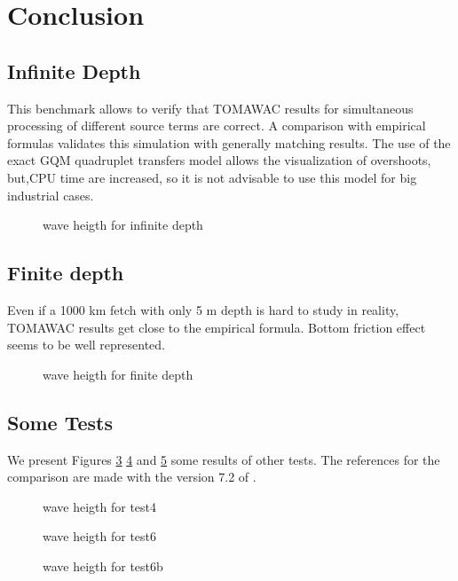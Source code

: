 \section{Conclusion}
\subsection{Infinite Depth}
This benchmark allows to verify that TOMAWAC results for simultaneous processing of different source terms are correct. A comparison with empirical formulas validates this simulation with generally matching results. The use of the exact GQM quadruplet transfers model allows the visualization of overshoots, but,CPU time are increased, so it is not advisable to use this model for big industrial cases.
\begin{figure}[h!]
  \centering
  \caption{wave heigth for infinite depth}
\label{resultinfinite}
\end{figure}

\subsection{Finite depth}
Even if a 1000 km fetch with only 5 m depth is hard to study in reality, TOMAWAC results get close to the empirical formula. Bottom friction effect seems to be well represented.
\begin{figure}[h!]
  \centering
  \caption{wave heigth for finite depth}
\label{finite}
\end{figure}


\subsection{Some Tests}
We present Figures \ref{test4} \ref{test6} and \ref{test6b} some results of other tests. The references for the comparison are made with the version 7.2 of \tomawac.   
\begin{figure}[h!]
  \centering
  \caption{wave heigth for test4}
\label{test4}
\end{figure}
\begin{figure}[h!]
  \centering
  \caption{wave heigth for test6}
\label{test6}
\end{figure}
\begin{figure}[h!]
  \centering
  \caption{wave heigth for test6b}
\label{test6b}
\end{figure}
